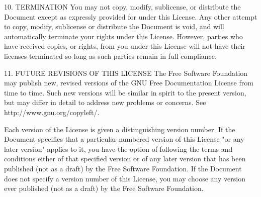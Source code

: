 10. TERMINATION
You may not copy, modify, sublicense, or distribute the Document except as expressly provided for under this License. Any other attempt to copy, modify, sublicense or distribute the Document is void, and will automatically terminate your rights under this License. However, parties who have received copies, or rights, from you under this License will not have their licenses terminated so long as such parties remain in full compliance.

11. FUTURE REVISIONS OF THIS LICENSE
The Free Software Foundation may publish new, revised versions of the GNU Free Documentation License from time to time. Such new versions will be similar in spirit to the present version, but may differ in detail to address new problems or concerns. See http://www.gnu.org/copyleft/.

Each version of the License is given a distinguishing version number. If the Document specifies that a particular numbered version of this License "or any later version" applies to it, you have the option of following the terms and conditions either of that specified version or of any later version that has been published (not as a draft) by the Free Software Foundation. If the Document does not specify a version number of this License, you may choose any version ever published (not as a draft) by the Free Software Foundation.